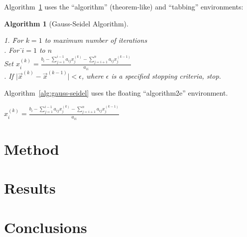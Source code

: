 \documentclass[oneside,12pt]{scrbook}
\theoremstyle{break}
\newtheorem{algorithm}[algocf]{Algorithm}
\begin{document}
Algorithm~\ref{alg:ex1} uses the ``algorithm'' (theorem-like) and ``tabbing'' environments:

\begin{algorithm}[Gauss-Seidel Algorithm]
\label{alg:ex1}
\begin{tabbing}
1. \=For $k=1$ to maximum number of iterations\\
. For \=$i=1$ to $n$\\
\>\>Set
\begin{math}
x_i^{(k)} =
\frac{b_i-\sum_{j=1}^{i-1}a_{ij}x_j^{(k)}
-\sum_{j=i+1}^{n}a_{ij}x_j^{(k-1)}}%
{a_{ii}}
\end{math}
\\
. If $\lvert\vec{x}^{(k)}-\vec{x}^{(k-1)}\rvert < \epsilon$,
where $\epsilon$ is a specified stopping criteria, stop.
\end{tabbing}
\end{algorithm}

Algorithm~\ref{alg:gauss-seidel} uses the floating ``algorithm2e'' environment.

\begin{algorithm2e}
\caption{Gauss-Seidel Algorithm}\label{alg:gauss-seidel}
{
   {
     $
      x_i^{(k)} =
      \frac{b_i-\sum_{j=1}^{i-1}a_{ij}x_j^{(k)}
      -\sum_{j=i+1}^{n}a_{ij}x_j^{(k-1)}}%
      {a_{ii}}
      $\;
   }
}
\end{algorithm2e}

\chapter{Method}
\label{ch:method}

\lipsum

\chapter{Results}
\label{ch:results}

\lipsum

\chapter{Conclusions}
\label{ch:conc}

\lipsum

\backmatter




\end{document}

